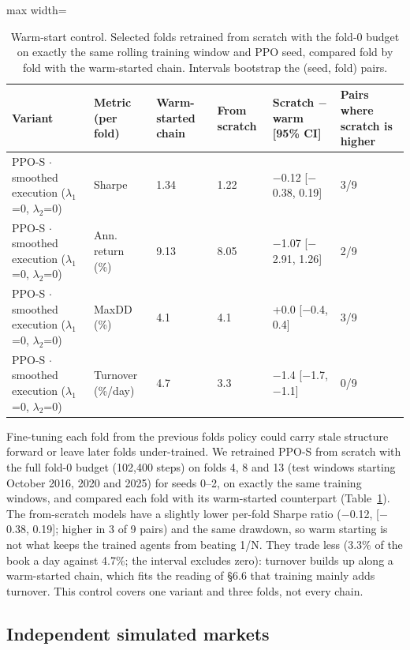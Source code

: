 \documentclass[11pt]{article}
\begin{document}
\begin{table}[!htbp]
\centering\scriptsize
\caption{Warm-start control. Selected folds retrained from scratch with the fold-0 budget on exactly the same rolling training window and PPO seed, compared fold by fold with the warm-started chain. Intervals bootstrap the (seed, fold) pairs.\label{tab-warm-no}}
\begin{adjustbox}{max width=\linewidth}
\begin{tabular}{@{}llllll@{}}
\toprule
Variant & Metric (per fold) & Warm-started chain & From scratch & Scratch $-$ warm {[}95\% CI{]} & Pairs where scratch is higher \\
\midrule
PPO-S $\cdot$ smoothed execution {($\lambda_1$=0, $\lambda_2$=0)} & Sharpe & 1.34 & 1.22 & $-$0.12 {[}$-$0.38, 0.19{]} & 3/9 \\
PPO-S $\cdot$ smoothed execution {($\lambda_1$=0, $\lambda_2$=0)} & Ann. return (\%) & 9.13 & 8.05 & $-$1.07 {[}$-$2.91, 1.26{]} & 2/9 \\
PPO-S $\cdot$ smoothed execution {($\lambda_1$=0, $\lambda_2$=0)} & MaxDD (\%) & 4.1 & 4.1 & +0.0 {[}$-$0.4, 0.4{]} & 3/9 \\
PPO-S $\cdot$ smoothed execution {($\lambda_1$=0, $\lambda_2$=0)} & Turnover (\%/day) & 4.7 & 3.3 & $-$1.4 {[}$-$1.7, $-$1.1{]} & 0/9 \\
\bottomrule
\end{tabular}
\end{adjustbox}
\end{table}

Fine-tuning each fold from the previous fold\textquotesingle s policy could carry stale structure forward or leave later folds under-trained. We retrained PPO-S from scratch with the full fold-0 budget (102,400 steps) on folds 4, 8 and 13 (test windows starting October 2016, 2020 and 2025) for seeds 0--2, on exactly the same training windows, and compared each fold with its warm-started counterpart (Table~\ref{tab-warm-no}). The from-scratch models have a slightly lower per-fold Sharpe ratio ($-$0.12, {[}$-$0.38, 0.19{]}; higher in 3 of 9 pairs) and the same drawdown, so warm starting is not what keeps the trained agents from beating 1/N. They trade less (3.3\% of the book a day against 4.7\%; the interval excludes zero): turnover builds up along a warm-started chain, which fits the reading of \S{}6.6 that training mainly adds turnover. This control covers one variant and three folds, not every chain.

\subsection{Independent simulated markets}\label{independent-simulated-markets}
\end{document}
